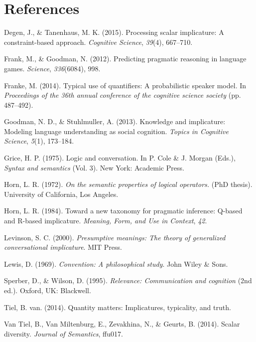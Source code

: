 \documentclass[10pt, letterpaper]{article}
\begin{document}
\section{References}\label{references}

\setlength{\parindent}{-0.1in} \setlength{\leftskip}{0.125in} \noindent

Degen, J., \& Tanenhaus, M. K. (2015). Processing scalar implicature: A
constraint-based approach. \emph{Cognitive Science}, \emph{39}(4),
667--710.

Frank, M., \& Goodman, N. (2012). Predicting pragmatic reasoning in
language games. \emph{Science}, \emph{336}(6084), 998.

Franke, M. (2014). Typical use of quantifiers: A probabilistic speaker
model. In \emph{Proceedings of the 36th annual conference of the
cognitive science society} (pp. 487--492).

Goodman, N. D., \& Stuhlmuller, A. (2013). Knowledge and implicature:
Modeling language understanding as social cognition. \emph{Topics in
Cognitive Science}, \emph{5}(1), 173--184.

Grice, H. P. (1975). Logic and conversation. In P. Cole \& J. Morgan
(Eds.), \emph{Syntax and semantics} (Vol. 3). New York: Academic Press.

Horn, L. R. (1972). \emph{On the semantic properties of logical
operators.} (PhD thesis). University of California, Los Angeles.

Horn, L. R. (1984). Toward a new taxonomy for pragmatic inference:
Q-based and R-based implicature. \emph{Meaning, Form, and Use in
Context}, \emph{42}.

Levinson, S. C. (2000). \emph{Presumptive meanings: The theory of
generalized conversational implicature}. MIT Press.

Lewis, D. (1969). \emph{Convention: A philosophical study}. John Wiley
\& Sons.

Sperber, D., \& Wilson, D. (1995). \emph{Relevance: Communication and
cognition} (2nd ed.). Oxford, UK: Blackwell.

Tiel, B. van. (2014). Quantity matters: Implicatures, typicality, and
truth.

Van Tiel, B., Van Miltenburg, E., Zevakhina, N., \& Geurts, B. (2014).
Scalar diversity. \emph{Journal of Semantics}, ffu017.
\end{document}
